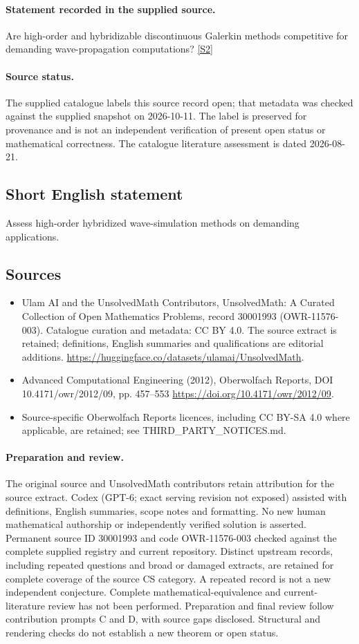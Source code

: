 \documentclass[11pt]{article}
\begin{document}
\paragraph{Statement recorded in the supplied source.}
Are high-order and hybridizable discontinuous Galerkin methods competitive for demanding wave-propagation computations? \href{https://doi.org/10.4171/owr/2012/09}{[S2]}
\paragraph{Source status.}
The supplied catalogue labels this source record open; that metadata was checked against the supplied snapshot on 2026-10-11. The label is preserved for provenance and is not an independent verification of present open status or mathematical correctness. The catalogue literature assessment is dated 2026-08-21.
\subsection{Short English statement}
Assess high-order hybridized wave-simulation methods on demanding applications.
\subsection{Sources}
\begin{itemize}
\item[S1] Ulam AI and the UnsolvedMath Contributors, UnsolvedMath: A Curated Collection of Open Mathematics Problems, record 30001993 (OWR-11576-003). Catalogue curation and metadata: CC BY 4.0. The source extract is retained; definitions, English summaries and qualifications are editorial additions.
\url{https://huggingface.co/datasets/ulamai/UnsolvedMath}.
\item[S2] Advanced Computational Engineering (2012), Oberwolfach Reports, DOI 10.4171/owr/2012/09, pp. 457--553
\url{https://doi.org/10.4171/owr/2012/09}.
\item Source-specific Oberwolfach Reports licences, including CC BY-SA 4.0 where applicable, are retained; see THIRD\_PARTY\_NOTICES.md.
\end{itemize}
\paragraph{Preparation and review.}
The original source and UnsolvedMath contributors retain attribution for the source extract. Codex (GPT-6; exact serving revision not exposed) assisted with definitions, English summaries, scope notes and formatting. No new human mathematical authorship or independently verified solution is asserted. Permanent source ID 30001993 and code OWR-11576-003 checked against the complete supplied registry and current repository. Distinct upstream records, including repeated questions and broad or damaged extracts, are retained for complete coverage of the source CS category. A repeated record is not a new independent conjecture. Complete mathematical-equivalence and current-literature review has not been performed. Preparation and final review follow contribution prompts C and D, with source gaps disclosed. Structural and rendering checks do not establish a new theorem or open status.
\label{end:30001993}
\end{document}
